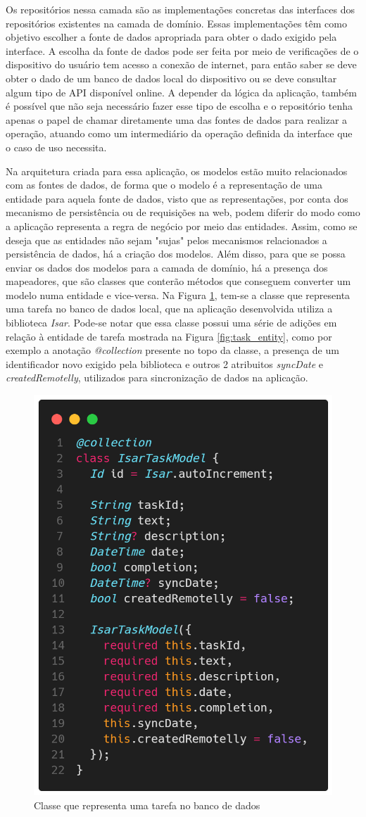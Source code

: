 \documentclass[12pt, %
openright, 
oneside, %
a4paper,    %
brazil]{facom-ufu-abntex2}
\begin{document}
Os repositórios nessa camada são as implementações concretas das interfaces dos repositórios existentes na camada de domínio. Essas implementações têm como objetivo escolher a fonte de dados apropriada para obter o dado exigido pela interface. A escolha da fonte de dados pode ser feita por meio de verificações de o dispositivo do usuário tem acesso a conexão de internet, para então saber se deve obter o dado de um banco de dados local do dispositivo ou se deve consultar algum tipo de API disponível online. A depender da lógica da aplicação, também é possível que não seja necessário fazer esse tipo de escolha e o repositório tenha apenas o papel de chamar diretamente uma das fontes de dados para realizar a operação, atuando como um intermediário da operação definida da interface que o caso de uso necessita.

Na arquitetura criada para essa aplicação, os modelos estão muito relacionados com as fontes de dados, de forma que o modelo é a representação de uma entidade para aquela fonte de dados, visto que as representações, por conta dos mecanismo de persistência ou de requisições na web, podem diferir do modo como a aplicação representa a regra de negócio por meio das entidades. Assim, como se deseja que as entidades não sejam "sujas" pelos mecanismos relacionados a persistência de dados, há a criação dos modelos. Além disso, para que se possa enviar os dados dos modelos para a camada de domínio, há a presença dos mapeadores, que são classes que conterão métodos que conseguem converter um modelo numa entidade e vice-versa. Na Figura \ref{fig:isar_task_model}, tem-se a classe que representa uma tarefa no banco de dados local, que na aplicação desenvolvida utiliza a biblioteca \textit{Isar}. Pode-se notar que essa classe possui uma série de adições em relação à entidade de tarefa mostrada na Figura \ref{fig:task_entity}, como por exemplo a anotação \textit{@collection} presente no topo da classe, a presença de um identificador novo exigido pela biblioteca e outros 2 atribuitos \textit{syncDate} e \textit{createdRemotelly}, utilizados para sincronização de dados na aplicação.

\begin{figure}[ht]
    \centering
    \includegraphics[width=.5\textwidth, trim={0 30 0 100}, clip]{figures/arch/isar_task_model.png}
    \caption{Classe que representa uma tarefa no banco de dados}
    \label{fig:isar_task_model}
\end{figure}
\end{document}
